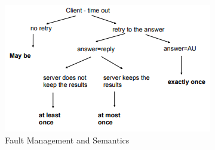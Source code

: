 \begin{figure}[!h]
    \centering
    \includegraphics[width=.7\linewidth]{images/requestReplayCommunication/faultmanagement.png}
    \caption{Fault Management and Semantics}
\end{figure}

